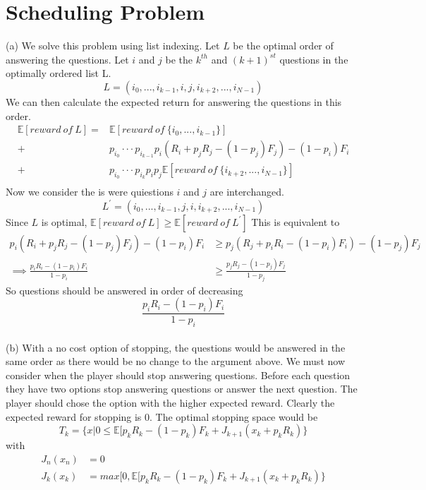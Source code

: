 \documentclass[11pt, oneside]{article}   	%
\begin{document}
\section{Scheduling Problem}
(a) We solve this problem using list indexing. Let $L$ be the optimal order of answering the questions. Let $i$ and $j$ be the $k^{th}$ and $(k + 1)^{st}$ questions in the optimally ordered list L.
$$
L = (i_{0},...,i_{k-1},i,j,i_{k+2},...,i_{N-1})
$$
We can then calculate the expected return for answering the questions in this order.
\begin{align*}
\mathbb{E}[{reward~of~L}] = & \mathbb{E} [reward~of~\{i_{0},...,i_{k-1}\}] \\
+ & p_{i_{0}}···p_{i_{k-1}} p_{i}(R_{i}+p_{j}R_{j} -(1-p_{j})F_{j})-(1-p_{i})F_{i}  \\
+ & p_{i_{0}} ···p_{i_{k}} p_{i}p_{j} \mathbb{E}[reward~of~\{i_{k+2},...,i_{N-1}\}] \\
\end{align*}
Now we consider the is were quiestions $i$ and $j$ are interchanged.
$$
L^{\prime} = (i_{0},...,i_{k-1},j,i,i_{k+2},...,i_{N-1})
$$
Since $L$ is optimal, $\mathbb{E}[{reward~of~L}] \geq \mathbb{E}[{reward~of~L^{\prime}}]$
This is equivalent to 
\begin{align*}
p_{i}(R_{i}+p_{j}R_{j} -(1-p_{j})F_{j})-(1-p_{i})F_{i} &\geq p_{j}(R_{j}+p_{i}R_{i} -(1-p_{i})F_{i})-(1-p_{j})F_{j} \\
\implies \frac{p_{i}R_{i}-(1-p_{i})F_{i}}{1-p_{i}} &\geq \frac{p_{j}R_{j}-(1-p_{j})F_{j}}{1-p_{j}}
\end{align*}
So questions should be answered in order of decreasing $$\frac{p_{i}R_{i}-(1-p_{i})F_{i}}{1-p_{i}}$$ \\

(b) With a no cost option of stopping, the questions would be answered in the same order as there would be no change to the argument above. We must now consider when the player should stop answering questions. Before each question they have two options stop answering questions or answer the next question. The player should chose the option with the higher expected reward. Clearly the expected reward for stopping is 0. The optimal stopping space would be 
$$T_{k}=\{x|0 \leq  \mathbb{E}[p_{k}R_{k}-(1-p_{k})F_{k} + J_{k+1}(x_{k}+p_{k}R_{k} ) \}$$
with 
\begin{align*}
J_{n}(x_{n}) &= 0\\
J_{k}(x_{k}) &= max[0, \mathbb{E}[p_{k}R_{k}-(1-p_{k})F_{k} + J_{k+1}(x_{k}+p_{k}R_{k} ) \}\\
\end{align*}
\end{document}
